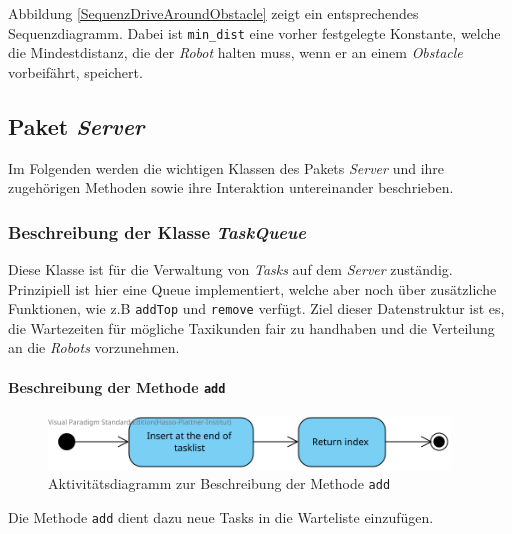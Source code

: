 			Abbildung \ref{SequenzDriveAroundObstacle} zeigt ein entsprechendes Sequenzdiagramm. 
			Dabei ist \texttt{min\_dist} eine vorher festgelegte Konstante, welche die Mindestdistanz, die der \textit{Robot} halten muss, wenn er an einem \textit{Obstacle} vorbeifährt, speichert.
	
\pagebreak
	
\subsection{Paket \textit{Server}}
	Im Folgenden werden die wichtigen Klassen des Pakets \textit{Server} 
	und ihre zugehörigen Methoden sowie ihre Interaktion untereinander beschrieben. 


	\subsubsection{Beschreibung der Klasse \textit{TaskQueue}}
	
	Diese Klasse ist für die Verwaltung von \textit{Tasks} auf dem \textit{Server} zuständig. Prinzipiell ist hier eine Queue implementiert, welche aber noch über zusätzliche Funktionen, wie z.B \texttt{addTop} und \texttt{remove} verfügt. Ziel dieser Datenstruktur ist es, die Wartezeiten für mögliche Taxikunden fair zu handhaben und die Verteilung an die \textit{Robots} vorzunehmen.
	
			\paragraph{Beschreibung der Methode \texttt{add}}		
			\begin{figure}[H]
			\centering
			\includegraphics[width=0.95\textwidth]{img/add}
			\caption{Aktivitätsdiagramm zur Beschreibung der Methode \texttt{add}}
			\label{SequenzQueueAdd}
			\end{figure}
			
			Die Methode \texttt{add} dient dazu neue Tasks in die Warteliste einzufügen.
			
